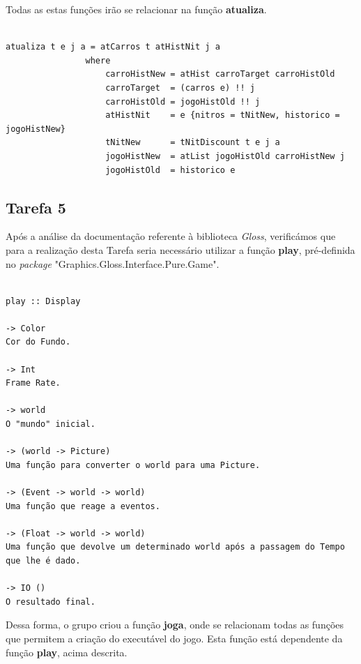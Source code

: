 \documentclass[a4paper]{report} %
\begin{document}
Todas as estas funções irão se relacionar na função \textbf{atualiza}.

\begin{verbatim}

atualiza t e j a = atCarros t atHistNit j a
                where
                    carroHistNew = atHist carroTarget carroHistOld
                    carroTarget  = (carros e) !! j
                    carroHistOld = jogoHistOld !! j
                    atHistNit    = e {nitros = tNitNew, historico = jogoHistNew}
                    tNitNew      = tNitDiscount t e j a
                    jogoHistNew  = atList jogoHistOld carroHistNew j
                    jogoHistOld  = historico e

\end{verbatim}

\normalsize

\newpage

\subsection{Tarefa 5}

Após a análise da documentação referente à biblioteca \textit{Gloss}, verificámos que para a realização desta Tarefa seria necessário utilizar a função \textbf{play}, pré-definida no \textit {package} "Graphics.Gloss.Interface.Pure.Game".

\scriptsize 
 
 \begin{verbatim}

play :: Display  

-> Color  
Cor do Fundo.

-> Int  
Frame Rate.

-> world  
O "mundo" inicial.

-> (world -> Picture) 
Uma função para converter o world para uma Picture.

-> (Event -> world -> world)  
Uma função que reage a eventos.

-> (Float -> world -> world)  
Uma função que devolve um determinado world após a passagem do Tempo que lhe é dado.

-> IO ()
O resultado final.

\end{verbatim}

\normalsize

Dessa forma, o grupo criou a função \textbf{joga}, onde se relacionam todas as funções que permitem a criação do executável do jogo. Esta função está dependente da função \textbf{play}, acima descrita.
\end{document}
